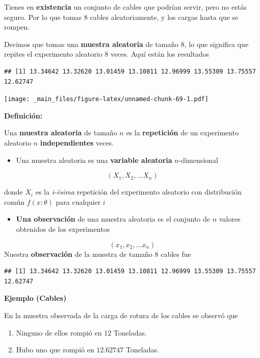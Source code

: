 \documentclass[
]{book}
\providecommand{\tightlist}{%
  \setlength{\itemsep}{0pt}\setlength{\parskip}{0pt}}
\begin{document}
Tienes en \textbf{existencia} un conjunto de cables que podrían servir, pero no estás seguro. Por lo que tomas \(8\) cables aleatoriamente, y los cargas hasta que se rompen.

Decimos que tomas una \textbf{muestra aleatoria} de tamaño \(8\), lo que significa que repites el experimento aleatorio \(8\) veces. Aquí están los resultados

\begin{verbatim}
## [1] 13.34642 13.32620 13.01459 13.10811 12.96999 13.55309 13.75557 12.62747
\end{verbatim}

\texttt{[image: \_main\_files/figure-latex/unnamed-chunk-69-1.pdf]}

\textbf{Definición:}

Una \textbf{muestra aleatoria} de tamaño \(n\) es la \textbf{repetición} de un experimento aleatorio \(n\) \textbf{independientes} veces.

\begin{itemize}
\tightlist
\item
  Una muestra aleatoria es una \textbf{variable aleatoria} \(n\)-dimensional
\end{itemize}

\[(X_1, X_2, ... X_n)\]

donde \(X_i\) es la \emph{i-ésima} repetición del experimento aleatorio con distribución común \(f(x; \theta)\) para cualquier \(i\)

\begin{itemize}
\tightlist
\item
  \textbf{Una observación} de una muestra aleatoria es el conjunto de \(n\) valores obtenidos de los experimentos
\end{itemize}

\[(x_1, x_2, ... x_n)\]
Nuestra \textbf{observación} de la muestra de tamaño \(8\) cables fue

\begin{verbatim}
## [1] 13.34642 13.32620 13.01459 13.10811 12.96999 13.55309 13.75557 12.62747
\end{verbatim}

\textbf{Ejemplo (Cables)}

En la muestra observada de la carga de rotura de los cables se observó que

\begin{enumerate}
\def\labelenumi{\arabic{enumi})}
\item
  Ninguno de ellos rompió en \(12\) Toneladas.
\item
  Hubo uno que rompió en \(12.62747\) Toneladas.
\end{enumerate}
\end{document}
